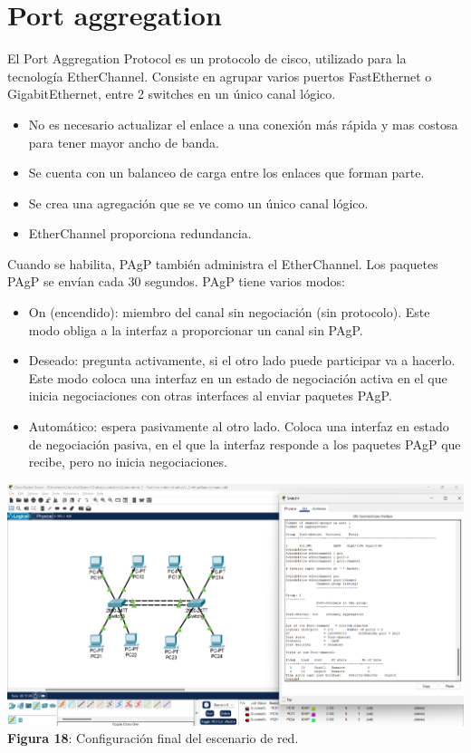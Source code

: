 \documentclass{article}
\begin{document}
    \pagebreak
    \section{Port aggregation}
    El Port Aggregation Protocol es un protocolo de cisco, utilizado para la tecnología EtherChannel. Consiste en agrupar varios puertos FastEthernet o GigabitEthernet, entre 2 switches en un único canal lógico.\\
    \begin{itemize}
        \item No es necesario actualizar el enlace a una conexión más rápida y mas costosa para tener mayor ancho de banda.
        \item Se cuenta con un balanceo de carga entre los enlaces que forman parte.
        \item Se crea una agregación que se ve como un único canal lógico.
        \item EtherChannel proporciona redundancia.
    \end{itemize}

    Cuando se habilita, PAgP también administra el EtherChannel. Los paquetes PAgP se envían cada 30 segundos. PAgP tiene varios modos:

    \begin{itemize}
        \item On (encendido): miembro del canal sin negociación (sin protocolo). Este modo obliga a la interfaz a proporcionar un canal sin PAgP.
        \item Deseado: pregunta activamente, si el otro lado puede participar va a hacerlo. Este modo coloca una interfaz en un estado de negociación activa en el que inicia negociaciones con otras interfaces al enviar paquetes PAgP.
        \item Automático: espera pasivamente al otro lado. Coloca una interfaz en estado de negociación pasiva, en el que la interfaz responde a los paquetes PAgP que recibe, pero no inicia negociaciones.
    \end{itemize}

    \begin{center}
        \includegraphics[width=0.775\linewidth]{img_22}  
        \linebreak
        \small {\bfseries Figura 18}: Configuración final del escenario de red.
    \end{center}
\end{document}
